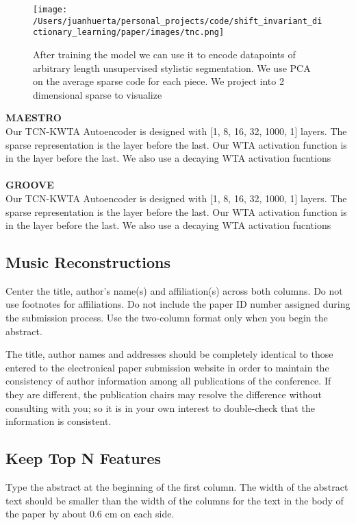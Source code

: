 \documentclass[11pt,a4paper]{article}
\begin{document}
\begin{figure}[ht]
  \texttt{[image: /Users/juanhuerta/personal\_projects/code/shift\_invariant\_dictionary\_learning/paper/images/tnc.png]}
  \caption{After training the model we can use it to encode datapoints of arbitrary length unsupervised stylistic segmentation. We use PCA on the average sparse code for each piece. We project into 2 dimensional sparse to visualize }
  \label{fig:boat1}
\end{figure}

\textbf{MAESTRO} 
\\
Our TCN-KWTA Autoencoder is designed with [1, 8, 16, 32, 1000, 1] layers. The sparse representation is the layer before the last. Our WTA activation function is in the layer before the last. We also use a decaying WTA activation fucntions
\\
\\
\textbf{GROOVE} 
\\
Our TCN-KWTA Autoencoder is designed with [1, 8, 16, 32, 1000, 1] layers. The sparse representation is the layer before the last. Our WTA activation function is in the layer before the last. We also use a decaying WTA activation fucntions


\subsection{Music Reconstructions}
\label{ssec:first}

Center the title, author's name(s) and affiliation(s) across both
columns. Do not use footnotes for affiliations. Do not include the
paper ID number assigned during the submission process. Use the
two-column format only when you begin the abstract.

The title, author names and addresses should be completely identical
to those entered to the electronical paper submission website in order
to maintain the consistency of author information among all
publications of the conference. If they are different, the publication
chairs may resolve the difference without consulting with you; so it
is in your own interest to double-check that the information is
consistent.

\subsection{Keep Top N Features }

Type the abstract at the beginning of the first
column. The width of the abstract text should be smaller than the
width of the columns for the text in the body of the paper by about
0.6 cm on each side. 
\end{document}
